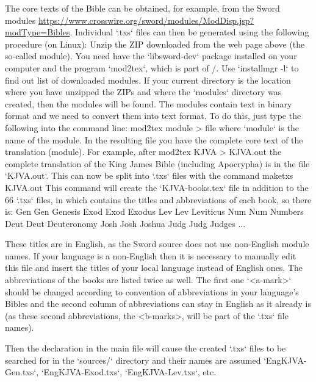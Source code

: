 The core texts of the Bible can be obtained, for example, from the Sword modules 
\url{https://www.crosswire.org/sword/modules/ModDisp.jsp?modType=Bibles}.
Individual `.txs` files can then be generated using the following procedure (on Linux):
Unzip the ZIP downloaded from the  web page above (the so-called module). You need
have the `libsword-dev` package installed on your computer and the program
`mod2tex`, which is part of \OpBible/. Use `installmgr -l` to find out
list of downloaded modules. If your current directory is the location where you
have unzipped the ZIPs and where the `modules` directory was created, then the modules will be found. The modules contain text in binary format and we need 
to convert them into text format. To do this, just type the following into the command line: 
\begtt 
mod2tex module > file
\endtt 
where `module` is the name of the module. In the resulting file
you have the complete core text of the translation (module).
For example, after
\begtt
mod2tex KJVA > KJVA.out
\endtt
the complete translation of the King James Bible (including Apocrypha) is in the file `KJVA.out`.
This can now be split into `.txs` files with the command
\begtt
maketxs KJVA.out
\endtt
This command will create the `KJVA-books.tex` file in addition to the 66 `.txs` files, in which
contains the titles and abbreviations of each book, so there is:
\begtt
\BookTitle Gen Gen {Genesis}
\BookTitle Exod Exod {Exodus}
\BookTitle Lev Lev {Leviticus}
\BookTitle Num Num  {Numbers}
\BookTitle Deut Deut {Deuteronomy}
\BookTitle Josh Josh {Joshua}
\BookTitle Judg Judg {Judges}
...
\endtt

These titles are in English, as the Sword source does not use non-English module names. 
If your language is a non-English then it is necessary to manually edit this file and insert the titles of your local language instead of English ones.
The abbreviations of the books are listed twice as well. The first one `<a-mark>` should be changed according to convention of abbreviations in your language's Bibles and the second column of abbreviations can stay in English as it already is (as these second abbreviations, the <b-marks>, will be part of the `.txs` file names).  

Then the declaration 
\begtt
\def\txsfile {sources/Eng\tmark-\bmark.txs}
\endtt
in the main file will cause the created `.txs` files to be searched for 
in the `sources/` directory and their names are assumed
`EngKJVA-Gen.txs`, `EngKJVA-Exod.txs`, `EngKJVA-Lev.txs`, etc.

